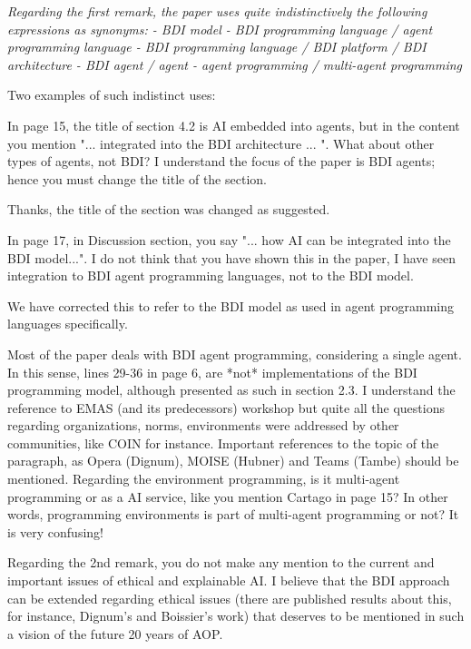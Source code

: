 \documentclass[12pt]{article}
\newenvironment{reviews}{\bigskip\itshape}{\upshape\bigskip}
\newenvironment{response}{\bigskip\normalfont}{\bigskip}
\begin{document}
\begin{reviews}
Regarding the first remark, the paper uses quite indistinctively the
following expressions as synonyms:
- BDI model
- BDI programming language / agent programming language
- BDI programming language / BDI platform / BDI architecture
- BDI agent / agent
- agent programming / multi-agent programming

Two examples of such indistinct uses:

In page 15, the title of section 4.2 is AI embedded into agents, but
in the content you mention "... integrated into the BDI architecture
... ". What about other types of agents, not BDI? I understand the
focus of the paper is BDI agents; hence you must change the title of
the section.

\begin{response}
Thanks, the title of the section was changed as suggested.
\end{response}

In page 17, in Discussion section, you say "... how AI can be
integrated into the BDI model...". I do not think that you have
shown this in the paper, I have seen integration to BDI agent
programming languages, not to the BDI model.

\begin{response}
We have corrected this to refer to the BDI model as used in agent programming languages specifically.
\end{response}

Most of the paper deals with BDI agent programming, considering a
single agent. In this sense, lines 29-36 in page 6, are *not*
implementations of the BDI programming model, although presented as
such in section 2.3. I understand the reference to EMAS (and its
predecessors) workshop but quite all the questions regarding
organizations, norms, environments were addressed by other
communities, like COIN for instance. Important references to the topic
of the paragraph, as Opera (Dignum), MOISE (Hubner) and Teams (Tambe)
should be mentioned.  Regarding the environment programming, is it
multi-agent programming or as a AI service, like you mention Cartago
in page 15? In other words, programming environments is part of multi-agent
programming or not? It is very confusing!

Regarding the 2nd remark, you do not make any mention to the current
and important issues of ethical and explainable AI. I believe that the
BDI approach can be extended regarding ethical issues (there are
published results about this, for instance, Dignum's and Boissier's
work) that deserves to be mentioned in such a vision of the future 20
years of AOP.


\end{reviews}
\end{document}
